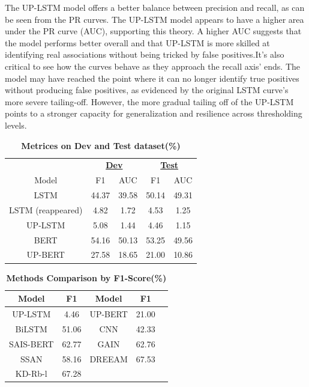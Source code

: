\documentclass[conference]{IEEEtran}
\begin{document}
The UP-LSTM model offers a better balance between precision and recall, as can be seen from the PR curves. The UP-LSTM model appears to have a higher area under the PR curve (AUC), supporting this theory. A higher AUC suggests that the model performs better overall and that UP-LSTM is more skilled at identifying real associations without being tricked by false positives.It's also critical to see how the curves behave as they approach the recall axis' ends. The model may have reached the point where it can no longer identify true positives without producing false positives, as evidenced by the original LSTM curve's more severe tailing-off. However, the more gradual tailing off of the UP-LSTM points to a stronger capacity for generalization and resilience across thresholding levels.

\begin{table}[H]
    \caption{\textbf{Metrices on Dev and Test dataset(\%)}}
    \centering
    \begin{tabular}{ccccc}
        \toprule
        &\multicolumn{2}{c}{\textbf{\underline{Dev}}}
        &\multicolumn{2}{c}{\textbf{\underline{Test}}} \\
        Model&F1&AUC&F1&AUC \\
        \midrule
        LSTM\cite{yao2019docred}&44.37&39.58&50.14&49.31 \\
        LSTM (reappeared)&4.82&1.72&4.53&1.25 \\
        UP-LSTM&5.08&1.44&4.46&1.15 \\
        BERT\cite{zeng2020double}&54.16&50.13&53.25&49.56 \\
        UP-BERT&27.58&18.65&21.00&10.86 \\ 
        \bottomrule
    \end{tabular}
\end{table}

\begin{table}[H]
    \caption{\textbf{Methods Comparison by F1-Score(\%)}}
    \centering
    \begin{tabular}{ccccc}
        \toprule
        Model&F1&Model&F1\\
        \midrule
        UP-LSTM&4.46&UP-BERT&21.00 \\
        BiLSTM\cite{yao2019docred}&51.06&CNN\cite{yao2019docred}&42.33 \\
        SAIS-BERT\cite{xiao2021sais}&62.77&GAIN\cite{zeng2020double}&62.76\\
        SSAN\cite{xu2021entity}&58.16&DREEAM\cite{ma2023dreeam}&67.53 \\
        KD-Rb-l\cite{TanQingyu2022RD-A}&67.28&& \\
        \bottomrule
    \end{tabular}
\end{table}
\end{document}
